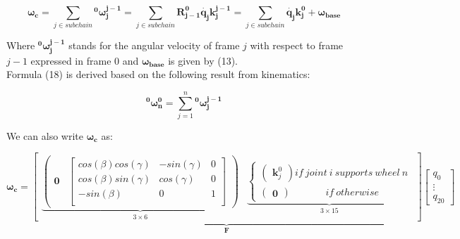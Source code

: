 \documentclass[a4paper]{article}
\begin{document}
\begin{equation}
\boldsymbol{\omega_{c}} = \sum_{j \in subchain}\boldsymbol{{}^0\omega_j^{j-1}} = \sum_{j \in subchain}\boldsymbol{R_{j-1}^{0}}\dot{\boldsymbol{q_{j}}}\boldsymbol{k_{j}^{j-1}} = \sum_{j \in subchain}\dot{\boldsymbol{q_{j}}}\boldsymbol{k_{j}^{0}} + \boldsymbol{\omega_{base}}
\end{equation}

\noindent Where $\boldsymbol{{}^0\omega_j^{j-1}}$ stands for the angular velocity of frame $j$ with respect to frame $j-1$ expressed in frame $0$ and $\boldsymbol{\omega_{base}}$ is given by (13).\\

\noindent Formula (18) is derived based on the following result from kinematics:

\begin{equation}
\boldsymbol{{}^0\omega_n^{0}} = \sum_{j = 1}^{n}\boldsymbol{{}^0\omega_j^{j-1}}
\end{equation}

\noindent We can also write $\boldsymbol{\omega_{c}}$ as:

\begin{equation}
\boldsymbol{\omega_{c}} = \underbrace{\begin{bmatrix}\underbrace{\begin{pmatrix} \boldsymbol{0} & \begin{bmatrix} cos(\beta)cos(\gamma) & -sin(\gamma) & 0 \\ 
                        cos(\beta)sin(\gamma) & cos(\gamma) & 0 \\
                        -sin(\beta) & 0 & 1 \\  \end{bmatrix}    \end{pmatrix}}_{3 \times 6} & \underbrace{\begin{cases}
        \begin{pmatrix} \boldsymbol{k}_{j}^{0} \end{pmatrix} if \ joint \ i \ supports \  wheel \ n \\
        \begin{pmatrix} \boldsymbol{0} \end{pmatrix} \ \ \ \ \ \ \ \ \ \ \ \ \ \ \ \ if \  otherwise
\end{cases}}_{3 \times 15}
\end{bmatrix}}_{\boldsymbol{F}}\begin{bmatrix} q_{0} \\ \vdots \\ q_{20} \end{bmatrix}
\end{equation}
\end{document}
